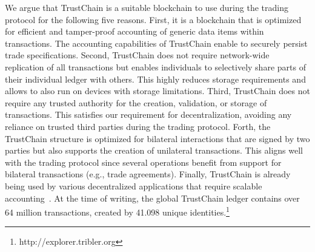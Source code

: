 We argue that TrustChain is a suitable blockchain to use during the \ModelName{} trading protocol for the following five reasons.
First, it is a blockchain that is optimized for efficient and tamper-proof accounting of generic data items within transactions.
The accounting capabilities of TrustChain enable \ModelName{} to securely persist trade specifications.
Second, TrustChain does not require network-wide replication of all transactions but enables individuals to selectively share parts of their individual ledger with others.
This highly reduces storage requirements and allows \ModelName{} to also run on devices with storage limitations.
Third, TrustChain does not require any trusted authority for the creation, validation, or storage of transactions.
This satisfies our requirement for decentralization, avoiding any reliance on trusted third parties during the \ModelName{} trading protocol.
Forth, the TrustChain structure is optimized for bilateral interactions that are signed by two parties but also supports the creation of unilateral transactions.
This aligns well with the \ModelName{} trading protocol since several operations benefit from support for bilateral transactions (e.g., trade agreements).
Finally, TrustChain is already being used by various decentralized applications that require scalable accounting~\cite{pouwelse2017laws}.
At the time of writing, the global TrustChain ledger contains over 64 million transactions, created by 41.098 unique identities.\footnote{http://explorer.tribler.org}


